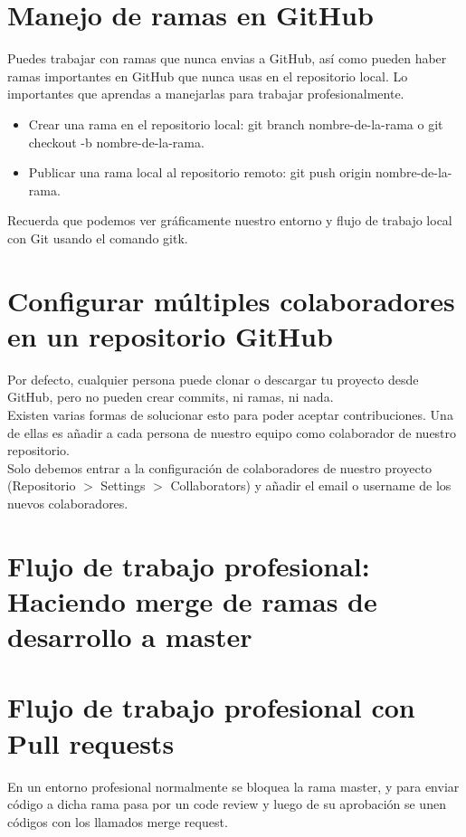 \documentclass{article}
\begin{document}
\section{Manejo de ramas en GitHub}%
Puedes trabajar con ramas que nunca envias a GitHub, así como pueden haber
ramas importantes en GitHub que nunca usas en el repositorio local. Lo
importantes que aprendas a manejarlas para trabajar profesionalmente.\\

\begin{itemize}
  \item Crear una rama en el repositorio local: git branch nombre-de-la-rama o
    git checkout -b nombre-de-la-rama.
  \item Publicar una rama local al repositorio remoto: git push origin
    nombre-de-la-rama.
\end{itemize}

Recuerda que podemos ver gráficamente nuestro entorno y flujo de trabajo local
con Git usando el comando gitk.

\section{Configurar múltiples colaboradores en un repositorio GitHub}%
Por defecto, cualquier persona puede clonar o descargar tu proyecto desde
GitHub, pero no pueden crear commits, ni ramas, ni nada.\\

Existen varias formas de solucionar esto para poder aceptar contribuciones. Una
de ellas es añadir a cada persona de nuestro equipo como colaborador de nuestro
repositorio.\\

Solo debemos entrar a la configuración de colaboradores de nuestro proyecto
(Repositorio $>$ Settings $>$ Collaborators) y añadir el email o username de los
nuevos colaboradores.\\

\section{Flujo de trabajo profesional: Haciendo merge de ramas de desarrollo a master}%

\section{Flujo de trabajo profesional con Pull requests}%
En un entorno profesional normalmente se bloquea la rama master, y para enviar
código a dicha rama pasa por un code review y luego de su aprobación se unen
códigos con los llamados merge request.\\
\end{document}

